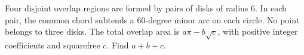 Four disjoint overlap regions are formed by pairs of disks of radius 6. In each pair, the common chord subtends a 60-degree minor arc on each circle. No point belongs to three disks. The total overlap area is $a\pi-b\sqrt c$, with positive integer coefficients and squarefree $c$. Find $a+b+c$.
